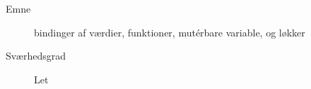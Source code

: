 \begin{description}
\item[Emne] bindinger af værdier, funktioner, mut\'{e}rbare variable,
  og løkker
\item[Sværhedsgrad] Let
\end{description}
